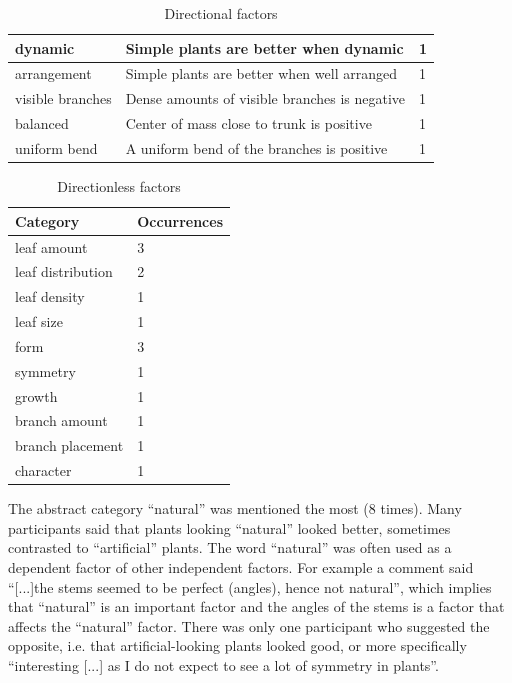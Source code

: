 \begin{table}
\begin{tabularx}{\textwidth}{| l | X | l |}
    \hline
    dynamic & Simple plants are better when dynamic & 1 \\
    \hline
    arrangement & Simple plants are better when well arranged & 1 \\
    \hline
    visible branches & Dense amounts of visible branches is negative & 1 \\
    \hline
    balanced & Center of mass close to trunk is positive & 1 \\
    \hline
    uniform bend & A uniform bend of the branches is positive & 1 \\
    \hline
    \end{tabularx}
    \caption{Directional factors}
    \label{tab:factors-dir}
\end{table}

\begin{table}
    \centering
    \begin{tabular}{| l | l |}
    \hline
    \textbf{Category} & \textbf{Occurrences} \\
    \hline
    leaf amount & 3 \\
    \hline
    leaf distribution & 2 \\
    \hline
    leaf density & 1 \\
    \hline
    leaf size & 1 \\
    \hline
    form & 3 \\
    \hline
    symmetry & 1 \\
    \hline
    growth & 1 \\
    \hline
    branch amount & 1 \\
    \hline
    branch placement & 1 \\
    \hline
    character & 1 \\
    \hline
    \end{tabular}
    \caption{Directionless factors}
    \label{tab:factors-nodir}
\end{table}

The abstract category ``natural'' was mentioned the most (8 times).
Many participants said that plants looking ``natural'' looked better, sometimes contrasted to ``artificial'' plants.
The word ``natural'' was often used as a dependent factor of other independent factors.
For example a comment said ``[...]the stems seemed to be perfect (angles), hence not natural'', which implies that ``natural'' is an important factor and the angles of the stems is a factor that affects the ``natural'' factor.
There was only one participant who suggested the opposite, i.e. that artificial-looking plants looked good, or more specifically ``interesting [...] as I do not expect to see a lot of symmetry in plants''.

